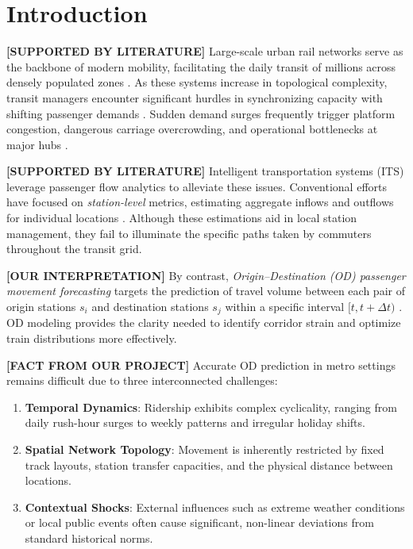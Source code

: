 \documentclass[conference]{IEEEtran}
\begin{document}
\section{Introduction}
\label{sec:intro}

\noindent \textbf{[SUPPORTED BY LITERATURE]} Large-scale urban rail networks serve as the backbone of modern mobility, facilitating the daily transit of millions across densely populated zones \cite{liu2020physical, zheng2014urban}. As these systems increase in topological complexity, transit managers encounter significant hurdles in synchronizing capacity with shifting passenger demands \cite{gong2020online}. Sudden demand surges frequently trigger platform congestion, dangerous carriage overcrowding, and operational bottlenecks at major hubs \cite{yao2018deep, toque2016short}.

\noindent \textbf{[SUPPORTED BY LITERATURE]} Intelligent transportation systems (ITS) leverage passenger flow analytics to alleviate these issues. Conventional efforts have focused on \textit{station-level} metrics, estimating aggregate inflows and outflows for individual locations \cite{zhang2019deep, wei2012forecasting}. Although these estimations aid in local station management, they fail to illuminate the specific paths taken by commuters throughout the transit grid.

\noindent \textbf{[OUR INTERPRETATION]} By contrast, \textit{Origin--Destination (OD) passenger movement forecasting} targets the prediction of travel volume between each pair of origin stations $s_i$ and destination stations $s_j$ within a specific interval $[t, t+\Delta t)$ \cite{gong2020online, toque2016short}. OD modeling provides the clarity needed to identify corridor strain and optimize train distributions more effectively.

\noindent \textbf{[FACT FROM OUR PROJECT]} Accurate OD prediction in metro settings remains difficult due to three interconnected challenges:
\begin{enumerate}
    \item \textbf{Temporal Dynamics}: Ridership exhibits complex cyclicality, ranging from daily rush-hour surges to weekly patterns and irregular holiday shifts.
    \item \textbf{Spatial Network Topology}: Movement is inherently restricted by fixed track layouts, station transfer capacities, and the physical distance between locations.
    \item \textbf{Contextual Shocks}: External influences such as extreme weather conditions or local public events often cause significant, non-linear deviations from standard historical norms.
\end{enumerate}
\end{document}
